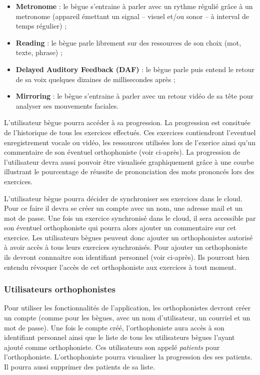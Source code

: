 \begin{itemize}
  \item \textbf{Metronome} : le bègue s'entraine à parler avec un rythme régulié grâce à un metronome (appareil émettant un signal -- visuel et/ou sonor -- à interval de temps régulier) ;
  \item \textbf{Reading} : le bègue parle librement sur des ressources de son choix (mot, texte, phrase) ;
  \item \textbf{Delayed Auditory Feedback (DAF)} : le bègue parle puis entend le retour de sa voix quelques dizaines de millisecondes après ;
  \item \textbf{Mirroring} : le bègue s'entraine à parler avec un retour vidéo de sa tête pour analyser ses mouvements faciales.
\end{itemize}

L'utilisateur bègue pourra accéder à sa progression. La progression est consituée de l'historique de tous les exercices effectués. Ces exercices contiendront l'eventuel enregistrement vocale ou vidéo, les ressources utilisées lors de l'exerice ainsi qu'un commentaire de son éventuel orthophoniste (voir ci-après). La progression de l'utilisateur devra aussi pouvoir être visualisée graphiquement grâce à une courbe illustrant le pourcentage de réussite de prononciation des mots prononcés lors des exercices.

L'utilisateur bègue pourra décider de synchroniser ses exercices dans le cloud. Pour ce faire il devra se créer un compte avec un nom, une adresse mail et un mot de passe. Une fois un exercice synchronisé dans le cloud, il sera accessible par son éventuel orthophoniste qui pourra alors ajouter un commentaire sur cet exercice. Les utilisateurs bègues peuvent donc ajouter un orthophonistes autorisé à avoir accès à tous leurs exercices synchronisés. Pour ajouter un orthophoniste ils devront connnaitre son identifiant personnel (voir ci-après). Ils pourront bien entendu révoquer l'accès de cet orthophoniste aux exercices à tout moment.

\subsubsection{Utilisateurs orthophonistes}

Pour utiliser les fonctionnalités de l'application, les orthophonistes devront créer un compte (comme pour les bègues, avec un nom d'utilisateur, un courriel et un mot de passe). Une fois le compte créé, l'orthophoniste aura accès à son identifiant personnel ainsi que le liste de tous les utilisateurs bègues l'ayant ajouté comme orthophoniste. Ces utilisateurs son appelé \textit{patients} pour l'orthophoniste. L'orthophoniste pourra visualiser la progression des ses patients. Il pourra aussi supprimer des patients de sa liste.















